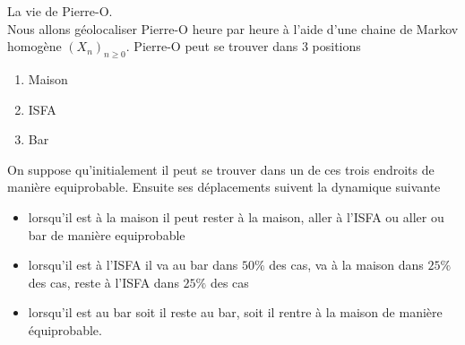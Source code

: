 \documentclass[11pt, addpoints, answers]{exam}
\begin{document}
\begin{questions}
\begin{parts}
\begin{solution}
\end{solution}
\end{parts}
\question La vie de Pierre-O. \\

Nous allons géolocaliser Pierre-O heure par heure à l'aide d'une chaine de Markov homogène $(X_n)_{n\geq0}$. Pierre-O peut se trouver dans $3$ positions
\begin{enumerate}
  \item Maison
  \item ISFA
  \item Bar
\end{enumerate}
On suppose qu'initialement il peut se trouver dans un de ces trois endroits de manière equiprobable. Ensuite ses déplacements suivent la dynamique suivante 
\begin{itemize}
  \item lorsqu'il est à la maison il peut rester à la maison, aller à l'ISFA ou aller ou bar de manière equiprobable
  \item lorsqu'il est à l'ISFA il va au bar dans $50\%$ des cas, va à la maison dans $25\%$ des cas, reste à l'ISFA dans $25\%$ des cas
  \item lorsqu'il est au bar soit il reste au bar, soit il rentre à la maison de manière équiprobable.
\end{itemize}
\end{questions}
\end{document}
